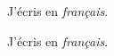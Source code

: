 \documentclass{report}
\begin{document}
J'écris en \emph{français}.

\begin{VRB}
J'écris en \emph{français}.
\end{VRB}
\end{document}
